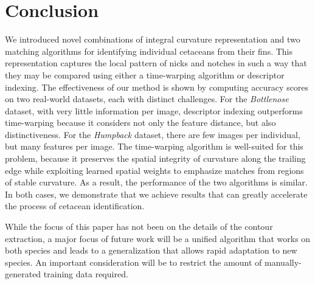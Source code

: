 \documentclass[10pt,twocolumn,letterpaper]{article}
\begin{document}
\section{Conclusion}
We introduced novel combinations of integral curvature representation and two
matching algorithms for identifying individual cetaceans from their fins.  This
representation captures the local pattern of nicks and notches in such a way
that they may be compared using either a time-warping algorithm or descriptor
indexing.  The effectiveness of our method is shown by computing accuracy
scores on two real-world datasets, each with distinct challenges.  For the
\emph{Bottlenose} dataset, with very little information per image, 
descriptor indexing outperforms time-warping because it considers not only the
feature distance, but also distinctiveness.  For the \emph{Humpback} dataset,
there are few images per individual, but many features per image.  The
time-warping algorithm is well-suited for this problem, because it preserves
the spatial integrity of curvature along the trailing edge while exploiting
learned spatial weights to emphasize matches from regions of stable curvature.
As a result, the performance of the two algorithms is similar.  In both
cases, we demonstrate that we achieve results that can greatly accelerate the
process of cetacean identification.

While the focus of this paper has not been on the details of the contour
extraction, a major focus of future work will be a unified algorithm that works
on both species and leads to a generalization that allows rapid adaptation to
new species. An important consideration will be to restrict the amount of
manually-generated training data required.


\pagebreak
{\small


}
\end{document}
